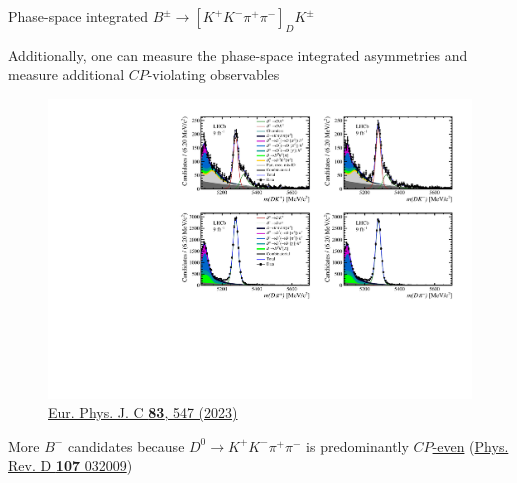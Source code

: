 \documentclass[xcolor={dvipsnames}]{beamer}
\begin{document}
\begin{frame}{Phase-space integrated $B^\pm\to[K^+K^-\pi^+\pi^-]_DK^\pm$}
  \begin{center}
    {\large Additionally, one can measure the phase-space integrated asymmetries and measure additional $C\!P$-violating observables}
  \end{center}
  \begin{figure}
    \centering
    \includegraphics[width = 1.0\textwidth,trim={0 7cm 0 0},clip=true]{Plots/d2kkpipi_fiveL_allDP_GLW.pdf}
    \vspace{-0.6cm}
    \caption*{\tiny\href{https://link.springer.com/article/10.1140/epjc/s10052-023-11560-5}{Eur. Phys. J. C \textbf{83}, 547 (2023)}}
  \end{figure}
  \vspace{-0.4cm}
  \begin{center}
    {\large More $B^-$ candidates because $D^0\to K^+K^-\pi^+\pi^-$ is predominantly \underline{$C\!P$-even} (\href{https://journals.aps.org/prd/abstract/10.1103/PhysRevD.107.032009}{Phys. Rev. D \textbf{107} 032009})}
  \end{center}
\end{frame}
\end{document}
